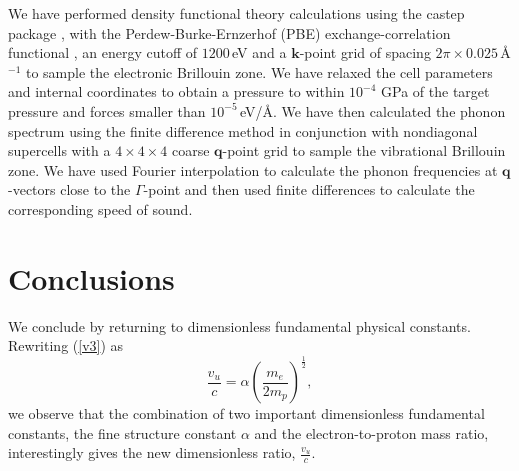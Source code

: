 \documentclass[aps,prl,groupedaddress,fleqn,twocolumn,10pt]{revtex4-1}
\begin{document}
We have performed density functional theory calculations using the {\sc castep} package \cite{castep}, with the Perdew-Burke-Ernzerhof (PBE) exchange-correlation functional \cite{pbe}, an energy cutoff of $1200$\,eV and a $\mathbf{k}$-point grid of spacing $2\pi\times0.025$\,\AA$^{-1}$ to sample the electronic Brillouin zone. We have relaxed the cell parameters and internal coordinates to obtain a pressure to within $10^{-4}$ GPa of the target pressure and forces smaller than $10^{-5}$\,eV/\AA. We have then calculated the phonon spectrum using the finite difference method \cite{fd_martin} in conjunction with nondiagonal supercells \cite{nondiagonal} with a $4\times4\times4$ coarse $\mathbf{q}$-point grid to sample the vibrational Brillouin zone. We have used Fourier interpolation to calculate the phonon frequencies at $\mathbf{q}$-vectors close to the $\Gamma$-point and then used finite differences to calculate the corresponding speed of sound.

\section{Conclusions}

We conclude by returning to dimensionless fundamental physical constants. Rewriting (\ref{v3}) as
\begin{equation}
\frac{v_u}{c}=\alpha\left(\frac{m_e}{2m_p}\right)^{\frac{1}{2}},
\label{v4}
\end{equation}
\noindent we observe that the combination of two important dimensionless fundamental constants, the fine structure constant $\alpha$ and the electron-to-proton mass ratio, interestingly gives the new dimensionless ratio, $\frac{v_u}c$.
\end{document}
